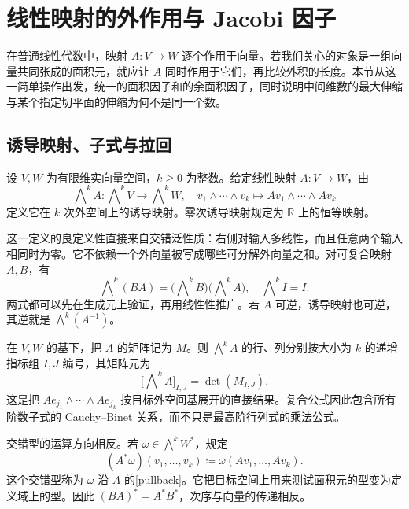 \section{线性映射的外作用与 Jacobi 因子}
\label{b1:sec:B104}

在普通线性代数中，映射 \(A:V\rightarrow W\) 逐个作用于向量。若我们关心的对象是一组向量共同张成的面积元，就应让 \(A\) 同时作用于它们，再比较外积的长度。本节从这一简单操作出发，统一的面积因子和的余面积因子，同时说明中间维数的最大伸缩与某个指定切平面的伸缩为何不是同一个数。

\subsection{诱导映射、子式与拉回}
\label{b1:subsec:B10401}

\begin{definition}\label{b1:def:app-b-exterior-map}
设 \(V,W\) 为有限维实向量空间，\(k\ge0\) 为整数。给定线性映射 \(A:V\rightarrow W\)，由
\[
 \bigwedge\nolimits^k A:
     \bigwedge\nolimits^kV\longrightarrow\bigwedge\nolimits^kW,
 \quad
 v_1\wedge\cdots\wedge v_k
       \longmapsto Av_1\wedge\cdots\wedge Av_k
\]
定义它在 \(k\) 次外空间上的诱导映射。零次诱导映射规定为 \(\mathbb R\) 上的恒等映射。
\end{definition}

这一定义的良定义性直接来自交错泛性质：右侧对输入多线性，而且任意两个输入相同时为零。它不依赖一个外向量被写成哪些可分解外向量之和。对可复合映射 \(A,B\)，有
\[
 \bigwedge\nolimits^k(BA)
  =\bigl(\bigwedge\nolimits^kB\bigr)
       \bigl(\bigwedge\nolimits^kA\bigr),\quad
 \bigwedge\nolimits^kI=I.
\]
两式都可以先在生成元上验证，再用线性性推广。若 \(A\) 可逆，诱导映射也可逆，其逆就是 \(\bigwedge^k(A^{-1})\)。

\ProseParagraphBreak

在 \(V,W\) 的基下，把 \(A\) 的矩阵记为 \(M\)。则 \(\bigwedge^kA\) 的行、列分别按大小为 \(k\) 的递增指标组 \(I,J\) 编号，其矩阵元为
\[
 \bigl[\bigwedge\nolimits^kA\bigr]_{I,J}=\det(M_{I,J}).
\]
这是把 \(Ae_{j_1}\wedge\cdots\wedge Ae_{j_k}\) 按目标外空间基展开的直接结果。复合公式因此包含所有阶数子式的 Cauchy--Binet 关系，而不只是最高阶行列式的乘法公式。

\ProseParagraphBreak

交错型的运算方向相反。若 \(\omega\in\bigwedge^kW^*\)，规定
\[
 (A^*\omega)(v_1,\ldots,v_k)
      \coloneqq\omega(Av_1,\ldots,Av_k).
\]
这个交错型称为 \(\omega\) 沿 \(A\) 的[pullback]。它把目标空间上用来测试面积元的型变为定义域上的型。因此 \((BA)^*=A^*B^*\)，次序与向量的传递相反。

